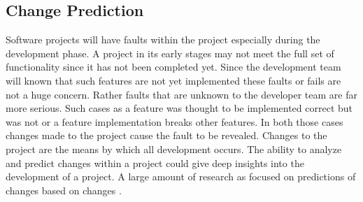 
\subsection{Change Prediction}

Software projects will have faults within the project especially during the development phase. A project in its early stages may not meet the full set of functionality since it has not been completed yet. Since the development team will known that such features are not yet implemented these faults or fails are not a huge concern. Rather faults that are unknown to the developer team are far more serious. Such cases as a feature was thought to be implemented correct but was not or a feature implementation breaks other features. In both those cases changes made to the project cause the fault to be revealed. Changes to the project are the means by which all development occurs. The ability to analyze and predict changes within a project could give deep insights into the development of a project. A large amount of research as focused on predictions of changes based on changes \cite{Bantelay2013, Chaturvedi2014, Giger2012, Hassan2004, Kagdi2007, Ying2004}.

